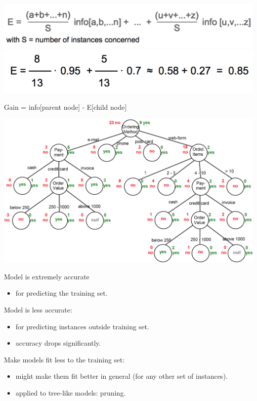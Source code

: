 \begin{breakbox}
\begin{breakbox}
\begin{center}
\includegraphics[width=.15\textwidth]{slides_images/entropy}
\includegraphics[width=.15\textwidth]{slides_images/entropy_example}
\end{center}
\end{breakbox}

\begin{breakbox}
\newline Gain = info[parent node] - E[child node]
\end{breakbox}

\begin{center}
\includegraphics[width=.15\textwidth]{slides_images/id3_tree}
\end{center}

\end{breakbox}

\begin{breakbox}
\newline Model is extremely accurate
\begin{itemize}
	\item for predicting the training set.
\end{itemize}
Model is less accurate:
\begin{itemize}
	\item for predicting instances outside training set.
	\item accuracy drops significantly.
\end{itemize}
Make models fit less to the training set:
\begin{itemize}
	\item might make them fit better in general (for any other set of instances).
	\item applied to tree-like models: pruning.
\end{itemize}
\end{breakbox}



